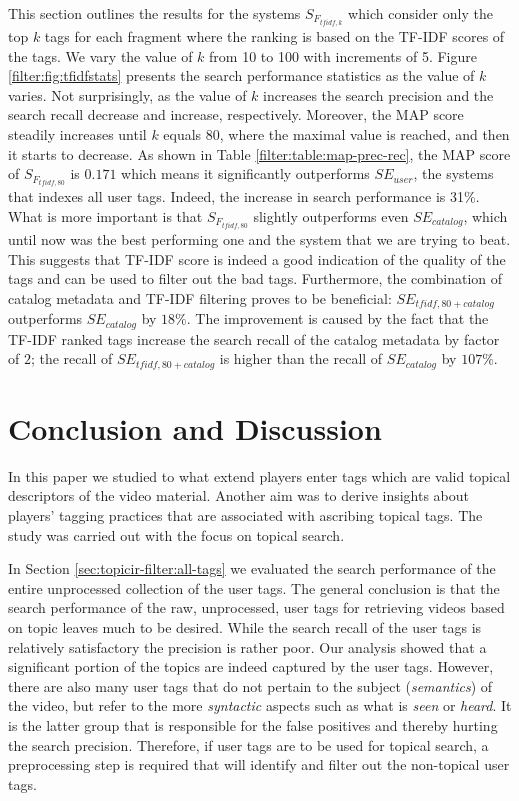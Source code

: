 This section outlines the results for the systems $S_{F_{tfidf,k}}$ which consider only the top $k$ tags for each fragment where the ranking is based on the TF-IDF scores of the tags. We vary the value of $k$ from 10 to 100 with increments of 5. Figure \ref{filter:fig:tfidfstats} presents the search performance statistics as the value of $k$ varies. Not surprisingly, as the value of $k$ increases the search precision and the search recall decrease and increase, respectively. Moreover, the MAP score steadily increases until $k$ equals 80, where the maximal value is reached, and then it starts to decrease. As shown in Table \ref{filter:table:map-prec-rec}, the MAP score of $S_{F_{tfidf,80}}$ is $0.171$ which means it significantly outperforms $SE_{user}$, the systems that indexes all user tags. Indeed, the increase in search performance is 31\%. What is more important is that $S_{F_{tfidf,80}}$ slightly outperforms even $SE_{catalog}$, which until now was the best performing one and the system that we are trying to beat. This suggests that TF-IDF score is indeed a good indication of the quality of the tags and can be used to filter out the bad tags. Furthermore, the combination of catalog metadata and TF-IDF filtering proves to be beneficial: $SE_{tfidf,80 + catalog}$ outperforms  $SE_{catalog}$ by $18\%$. The improvement is caused by the fact that the TF-IDF ranked tags increase the search recall of the catalog metadata by factor of $2$; the recall of $SE_{tfidf,80 + catalog}$ is higher than the recall of $SE_{catalog}$ by $107\%$.

\section{Conclusion and Discussion}\label{sec:topicir-filter:con}
In this paper we studied to what extend players enter tags which are valid topical descriptors of the video material. Another aim was to derive insights about players’ tagging practices that are associated with ascribing topical tags. The study was carried out with the focus on topical search.

In Section \ref{sec:topicir-filter:all-tags} we evaluated the search performance of the entire unprocessed collection of the user tags. The general conclusion is that the search performance of the raw, unprocessed, user tags for retrieving videos based on topic leaves much to be desired. While the search recall of the user tags is relatively satisfactory the precision is rather poor. Our analysis showed that a significant portion of the topics are indeed captured by the user tags. However, there are also many user tags that do not pertain to the subject (\textit{semantics}) of the video, but refer to the more \textit{syntactic} aspects such as what is \textit{seen} or \textit{heard}. It is the latter group that is responsible for the false positives and thereby hurting the search precision. Therefore, if user tags are to be used for topical search, a preprocessing step is required that will identify and filter out the non-topical user tags.

